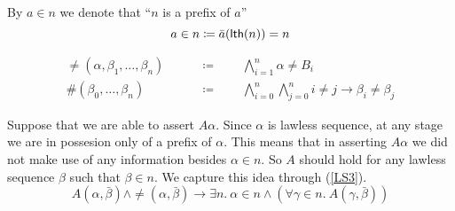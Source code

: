 \documentclass[11pt]{article}
\begin{document}
\begin{notation}
  By $a \in n$ we denote that ``$n$ is a prefix of $a$''
  \[ a \in n \coloneqq \bar{a}(\mathsf{lth}(n)) = n \]
\end{notation}

\begin{notation}
  \begin{align*}
  \neq(\alpha, \beta_1, \dots, \beta_n) \qquad &\coloneqq \qquad
    \bigwedge_{i=1}^{n} \alpha \neq B_i\\
  \#(\beta_0, \dots, \beta_n) \qquad &\coloneqq \qquad
    \bigwedge_{i=0}^n \bigwedge_{j=0}^n i \neq j \rightarrow \beta_i \neq \beta_j
  \end{align*}
\end{notation}

Suppose that we are able to assert $A\alpha$. Since $\alpha$ is lawless
sequence, at any stage we are in possesion only of a prefix of $\alpha$. This
means that in asserting $A\alpha$ we did not make use of any information
besides  $\alpha \in n$. So $A$ should hold for any lawless sequence $\beta$
such that $\beta \in n$. We capture this idea through (\ref{LS3}).
\begin{equation}\label{LS3}
  A(\alpha, \bar{\beta}) \land \neq(\alpha, \bar{\beta})
  \rightarrow \exists n.\ \alpha \in n \land
  (\forall \gamma \in n.\ A(\gamma, \bar{\beta}))
  \tag{LS3}
\end{equation}




\end{document}
